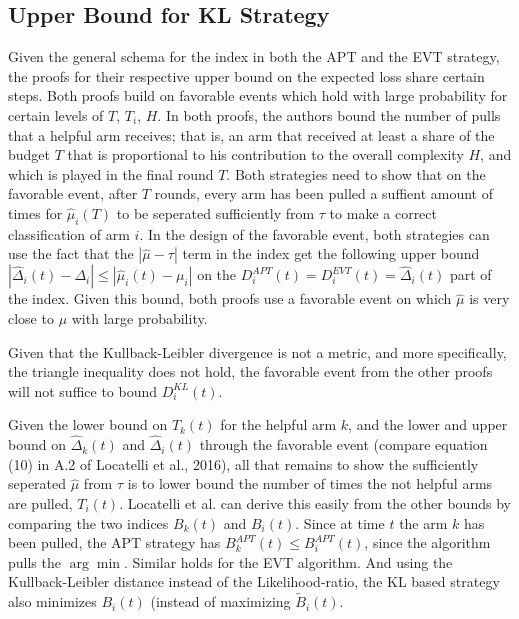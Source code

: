 \documentclass[12pt,]{article}
\begin{document}
\subsection{Upper Bound for KL
Strategy}\label{upper-bound-for-kl-strategy}

Given the general schema for the index in both the APT and the EVT
strategy, the proofs for their respective upper bound on the expected
loss share certain steps. Both proofs build on favorable events which
hold with large probability for certain levels of \(T\), \(T_i\), \(H\).
In both proofs, the authors bound the number of pulls that a helpful arm
receives; that is, an arm that received at least a share of the budget
\(T\) that is proportional to his contribution to the overall complexity
\(H\), and which is played in the final round \(T\). Both strategies
need to show that on the favorable event, after \(T\) rounds, every arm
has been pulled a suffient amount of times for \(\hat{\mu}_i(T)\) to be
seperated sufficiently from \(\tau\) to make a correct classification of
arm \(i\). In the design of the favorable event, both strategies can use
the fact that the \(|\hat{\mu} - \tau|\) term in the index get the
following upper bound
\(|\hat{\Delta}_i(t) - \Delta_i| \leq |\hat{\mu}_i(t)-\mu_i|\) on the
\(D_i^{APT}(t) = D_i^{EVT}(t) = \hat{\Delta}_i(t)\) part of the index.
Given this bound, both proofs use a favorable event on which
\(\hat{\mu}\) is very close to \(\mu\) with large probability.

Given that the Kullback-Leibler divergence is not a metric, and more
specifically, the triangle inequality does not hold, the favorable event
from the other proofs will not suffice to bound \(D_i^{KL}(t)\).

Given the lower bound on \(T_k(t)\) for the helpful arm \(k\), and the
lower and upper bound on \(\hat{\Delta}_k(t)\) and \(\hat{\Delta}_i(t)\)
through the favorable event (compare equation (10) in A.2 of Locatelli
et al., 2016), all that remains to show the sufficiently seperated
\(\hat{\mu}\) from \(\tau\) is to lower bound the number of times the
not helpful arms are pulled, \(T_i(t)\). Locatelli et al. can derive
this easily from the other bounds by comparing the two indices
\(B_k(t)\) and \(B_i(t)\). Since at time \(t\) the arm \(k\) has been
pulled, the APT strategy has \(B_k^{APT}(t) \leq B_i^{APT}(t)\), since
the algorithm pulls the \(\arg \min\). Similar holds for the EVT
algorithm. And using the Kullback-Leibler distance instead of the
Likelihood-ratio, the KL based strategy also minimizes \(B_i(t)\)
(instead of maximizing \(\tilde{B}_i(t)\).
\end{document}
